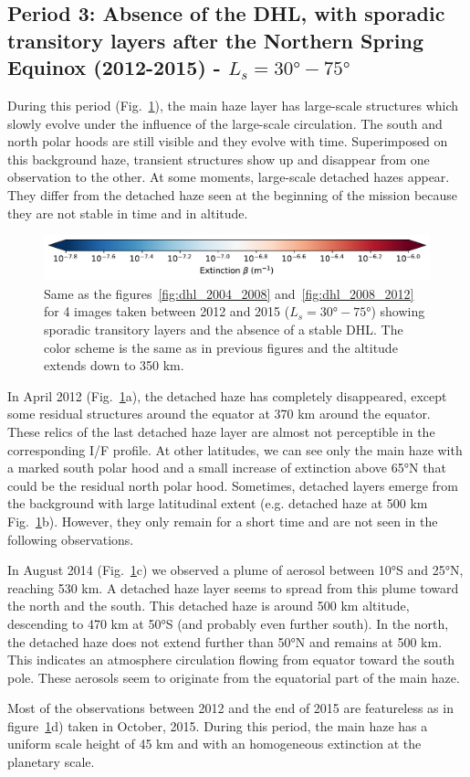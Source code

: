\subsection{Period 3: Absence of the DHL, with sporadic transitory layers after the Northern Spring Equinox (2012-2015) - $L_s=\ang{30}-\ang{75}$}

During this period (Fig.~\ref{fig:dhl_2012_2015}), the main haze layer has large-scale structures which slowly evolve under the influence of the
large-scale circulation. The south and north polar hoods are still visible and they evolve
with time. Superimposed on this background haze, transient structures show up and disappear from one observation
to the other. At some moments, large-scale detached hazes appear. They differ from the detached haze seen at the
beginning of the mission because they are not stable in time and in altitude.

\begin{figure}[!ht]
\includegraphics[width=.5\textwidth]{Fig/Extinction_colorbar}
\caption{Same as the figures~\ref{fig:dhl_2004_2008} and~\ref{fig:dhl_2008_2012}
for 4 images taken between 2012 and 2015 ($L_s=\ang{30}-\ang{75}$) showing sporadic
transitory layers and the absence of a stable DHL.
The color scheme is the same as in previous figures and the altitude extends down to 350 km.}
\label{fig:dhl_2012_2015}
\end{figure}

In April 2012 (Fig.~\ref{fig:dhl_2012_2015}a), the detached haze has completely disappeared, except some residual
structures around the equator at 370 km around the equator.
These relics of the last detached haze layer are almost not perceptible in the corresponding I/F profile. At other
latitudes, we can see only the main haze with a marked south polar hood and a small increase of extinction above
\ang{65}N that could be the residual north polar hood. Sometimes, detached layers emerge from the background with large latitudinal
extent (e.g. detached haze at 500 km Fig.~\ref{fig:dhl_2012_2015}b). However, they only remain for a short time
and are not seen in the following observations.

In August 2014 (Fig.~\ref{fig:dhl_2012_2015}c) we observed a plume of aerosol between \ang{10}S and \ang{25}N,
reaching 530 km. A detached haze layer seems to spread from this plume toward the north and the south. This
detached haze is around 500 km altitude, descending to 470 km at \ang{50}S (and probably even further south). In the
north, the detached haze does not extend further than \ang{50}N and remains at 500 km. This indicates an
atmosphere circulation flowing from equator toward the south pole. These aerosols seem to originate
from the equatorial part of the main haze.

Most of the observations between 2012 and the end of 2015 are featureless as in figure~\ref{fig:dhl_2012_2015}d)
taken in October, 2015. During this period, the main haze has a uniform scale height of 45 km and
with an homogeneous extinction at the planetary scale.
